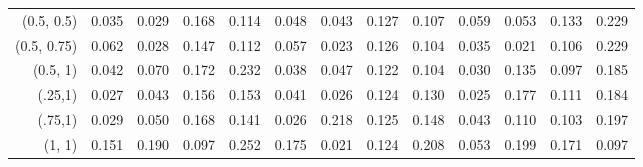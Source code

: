 \documentclass[11pt,fleqn]{article}
\begin{document}
{\begin{landscape}
\begin{table}[htbp]
\begin{tabular}{|r|rrrr|rrrr|rrrr|}
			\hline
			(0.5, 0.5) & 0.035 & 0.029 & 0.168 & 0.114 & 0.048 & 0.043 & 0.127 & 0.107 & 0.059 & 0.053 & 0.133 & 0.229 \\
			(0.5, 0.75) & 0.062 & 0.028 & 0.147 & 0.112 & 0.057 & 0.023 & 0.126 & 0.104 & 0.035 & 0.021 & 0.106 & 0.229 \\
			(0.5, 1) & 0.042 & 0.070 & 0.172 & 0.232 & 0.038 & 0.047 & 0.122 & 0.104 & 0.030 & 0.135 & 0.097 & 0.185 \\
			\hline
			(.25,1) & 0.027 & 0.043 & 0.156 & 0.153 & 0.041 & 0.026 & 0.124 & 0.130 & 0.025 & 0.177 & 0.111 & 0.184 \\
			(.75,1) & 0.029 & 0.050 & 0.168 & 0.141 & 0.026 & 0.218 & 0.125 & 0.148 & 0.043 & 0.110 & 0.103 & 0.197 \\
			(1, 1) & 0.151 & 0.190 & 0.097 & 0.252 & 0.175 & 0.021 & 0.124 & 0.208 & 0.053 & 0.199 & 0.171 & 0.097 \\
			\hline
		\end{tabular}
		\label{tab:3}
	\end{table}
\end{landscape}

}
\end{document}
